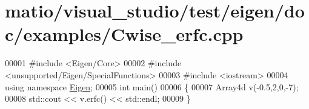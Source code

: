 \hypertarget{matio_2visual__studio_2test_2eigen_2doc_2examples_2_cwise__erfc_8cpp_source}{}\section{matio/visual\+\_\+studio/test/eigen/doc/examples/\+Cwise\+\_\+erfc.cpp}
\label{matio_2visual__studio_2test_2eigen_2doc_2examples_2_cwise__erfc_8cpp_source}

\begin{DoxyCode}
00001 \textcolor{preprocessor}{#include <Eigen/Core>}
00002 \textcolor{preprocessor}{#include <unsupported/Eigen/SpecialFunctions>}
00003 \textcolor{preprocessor}{#include <iostream>}
00004 \textcolor{keyword}{using namespace }\hyperlink{namespace_eigen}{Eigen};
00005 \textcolor{keywordtype}{int} main()
00006 \{
00007   Array4d v(-0.5,2,0,-7);
00008   std::cout << v.erfc() << std::endl;
00009 \}
\end{DoxyCode}
